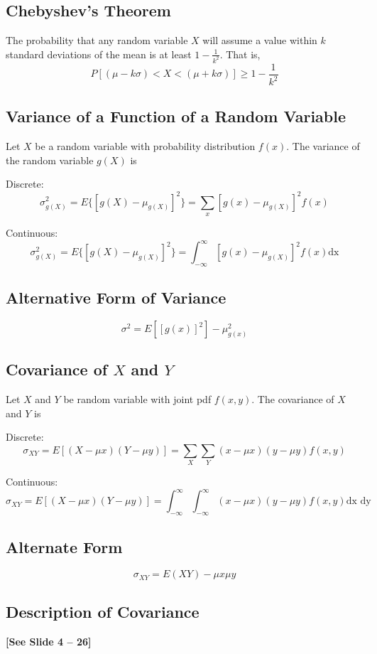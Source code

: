 \documentclass{book}
\begin{document}
\subsection{Chebyshev's Theorem}

The probability that any random variable $X$ will assume a value within $k$ standard deviations of the mean is at least $1-\frac{1}{k^2}$. That is,
$$P[(\mu - k\sigma) < X < (\mu + k\sigma)] \ge 1 - \frac{1}{k^2}$$

\subsection{Variance of a Function of a Random Variable}
Let $X$ be a random variable with probability distribution $f(x)$. The variance of the random variable $g(X)$ is

Discrete:
$$\sigma^2_{g(X)} = E\{[g(X) - \mu_{g(X)}]^2\} = \sum_x [g(x) - \mu_{g(X)}]^2 f(x)$$

Continuous:
$$\sigma^2_{g(X)} = E\{[g(X) - \mu_{g(X)}]^2\} = \int_{-\infty}^\infty [g(x) - \mu_{g(X)}]^2 f(x) \text{dx}$$

\subsection{Alternative Form of Variance}
$$\sigma^2 = E[[g(x)]^2]-\mu^2_{g(x)}$$

\subsection{Covariance of $X$ and $Y$}
Let $X$ and $Y$ be random variable with joint pdf  $f(x,y)$. The covariance of $X$ and $Y$ is

Discrete:
$$\sigma_{XY} = E[(X-\mu x)(Y-\mu y)]=\sum_X \sum_Y (x-\mu x)(y-\mu y) f(x,y)$$

Continuous:
$$\sigma_{XY} = E[(X-\mu x)(Y-\mu y)]=\int_{-\infty}^\infty \int_{-\infty}^\infty (x-\mu x)(y-\mu y) f(x,y) \text{dx dy}$$

\subsection{Alternate Form}
$$\sigma_{XY}=E(XY) - \mu x \mu y$$

\subsection{Description of Covariance}
\textbf{[See Slide 4 -- 26]}
\end{document}
